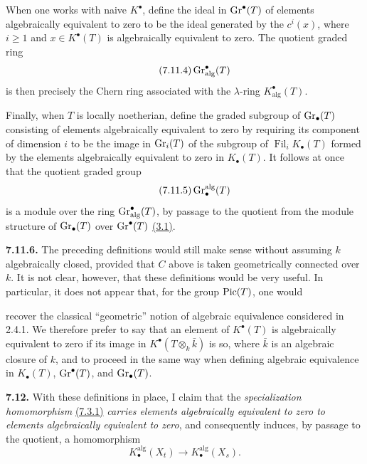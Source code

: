 When one works with naive $K^\bullet$, define the ideal in $\operatorname{Gr}^\bullet(T)$
of elements algebraically equivalent to zero to be the ideal generated by the
$c^i(x)$, where $i\geq1$ and $x\in K^\bullet(T)$ is algebraically equivalent
to zero. The quotient graded ring
\begin{equation}\tag{7.11.4}
\operatorname{Gr}^\bullet_{\mathrm{alg}}(T)
\end{equation}
is then precisely the Chern ring associated with the $\lambda$-ring
$K^\bullet_{\mathrm{alg}}(T)$.

Finally, when $T$ is locally noetherian, define the graded subgroup of
$\operatorname{Gr}_\bullet(T)$ consisting of elements algebraically equivalent to zero by
requiring its component of dimension $i$ to be the image in $\operatorname{Gr}_i(T)$ of
the subgroup of $\operatorname{Fil}_iK_\bullet(T)$ formed by the elements algebraically
equivalent to zero in $K_\bullet(T)$. It follows at once that the quotient
graded group
\begin{equation}\tag{7.11.5}
\operatorname{Gr}_\bullet^{\mathrm{alg}}(T)
\end{equation}
is a module over the ring $\operatorname{Gr}^\bullet_{\mathrm{alg}}(T)$, by passage to the
quotient from the module structure of $\operatorname{Gr}_\bullet(T)$ over
$\operatorname{Gr}^\bullet(T)$ \hyperlink{sga6.e10.sec.3.1}{(3.1)}.

\textbf{7.11.6.}
The preceding definitions would still make sense without assuming $k$
algebraically closed, provided that $C$ above is taken geometrically
connected over $k$. It is not clear, however, that these definitions would
be very useful. In particular, it does not appear that, for the group
$\operatorname{Pic}(T)$, one would

recover the classical ``geometric'' notion of algebraic equivalence
considered in 2.4.1. We therefore prefer to say that an element of
$K^\bullet(T)$ is algebraically equivalent to zero if its image in
$K^\bullet(T\otimes_k\bar k)$ is so, where $\bar k$ is an algebraic closure
of $k$, and to proceed in the same way when defining algebraic equivalence
in $K_\bullet(T)$, $\operatorname{Gr}^\bullet(T)$, and $\operatorname{Gr}_\bullet(T)$.

\textbf{7.12.}
With these definitions in place, I claim that the \emph{specialization homomorphism}
\hyperlink{sga6.e10.eq.7-3-1}{(7.3.1)}
\emph{carries elements algebraically equivalent to zero to elements
algebraically equivalent to zero}, and consequently induces, by passage to
the quotient, a homomorphism
\begin{equation}\tag{7.12.1}
K_\bullet^{\mathrm{alg}}(X_t)
\longrightarrow K_\bullet^{\mathrm{alg}}(X_s).
\end{equation}

